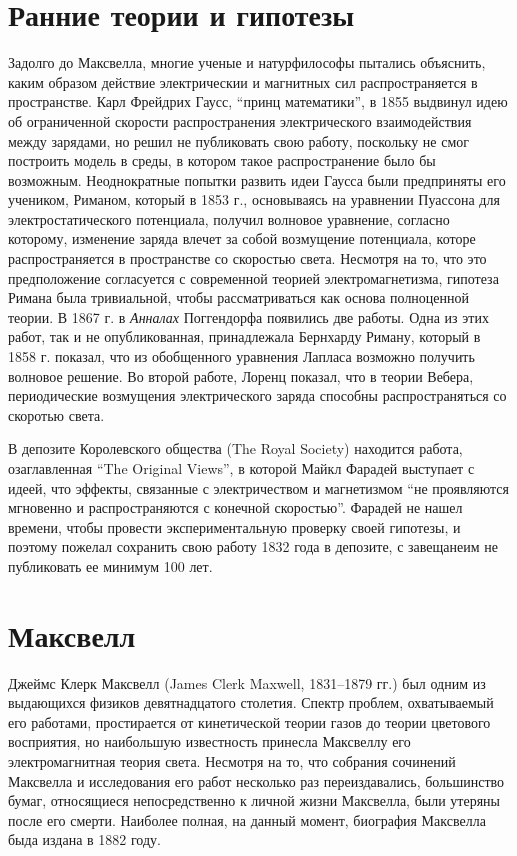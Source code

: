 \documentclass[12pt, oneside, a4paper]{article}
\begin{document}
\section*{Ранние теории и гипотезы}
Задолго до Максвелла, многие ученые и натурфилософы пытались объяснить, каким образом действие электрическии и магнитных  сил распространяется в пространстве. Карл Фрейдрих Гаусс, ``принц математики'', в 1855 выдвинул идею об ограниченной скорости распространения электрического взаимодействия между зарядами, но решил не публиковать свою работу, поскольку не смог построить модель в среды, в котором такое распространение было бы возможным. Неоднократные попытки развить идеи Гаусса были предприняты его учеником, Риманом, который в 1853 г., основываясь на уравнении Пуассона для электростатического потенциала, получил волновое уравнение, согласно которому, изменение заряда влечет за собой возмущение потенциала, которе распространяется в пространстве со скоростью света. Несмотря на то, что это предположение согласуется с современной теорией электромагнетизма, гипотеза Римана была тривиальной, чтобы рассматриваться как основа полноценной теории. В 1867 г. в \emph{Анналах} Поггендорфа появились две работы. Одна из этих работ, так и не опубликованная, принадлежала Бернхарду Риману, который в 1858 г. показал, что из обобщенного уравнения Лапласа возможно получить волновое решение. Во второй работе, Лоренц показал, что в теории Вебера, периодические возмущения электрического заряда способны распространяться со скоротью света.

В депозите Королевского общества (The Royal Society) находится работа, озаглавленная ``The Original Views'', в которой Майкл Фарадей выступает с идеей, что эффекты, связанные с электричеством и магнетизмом ``не проявляются мгновенно и распространяются с конечной скоростью''. Фарадей не нашел времени, чтобы провести экспериментальную проверку своей гипотезы, и поэтому пожелал сохранить свою работу 1832 года в депозите, с завещанеим не публиковать ее минимум 100 лет.
\section*{Максвелл}
Джеймс Клерк Максвелл (James Clerk Maxwell, 1831--1879 гг.) был одним из выдающихся физиков девятнадцатого столетия. Спектр проблем, охватываемый его работами, простирается от кинетической теории газов до теории цветового восприятия, но наибольшую известность принесла Максвеллу его электромагнитная теория света. Несмотря на то, что собрания сочинений Максвелла и исследования его работ несколько раз переиздавались, большинство бумаг, относящиеся непосредственно к личной жизни Максвелла, были утеряны после его смерти. Наиболее полная, на данный момент, биография Максвелла быда издана в 1882 году.
\end{document}
